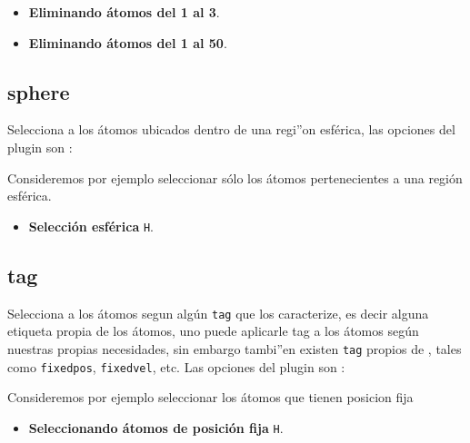 \begin{itemize}
 \item \textbf{Eliminando \'atomos del 1 al 3}.
 \item \textbf{Eliminando \'atomos del 1 al 50}.
\end{itemize}

\subsection{sphere}
Selecciona a los \'atomos ubicados dentro de una regi''on esf\'erica, las opciones del plugin son :


Consideremos por ejemplo seleccionar s\'olo los \'atomos pertenecientes a una regi\'on esf\'erica.

\begin{itemize}
 \item \textbf{Selecci\'on esf\'erica} \texttt{H}.
\end{itemize}

\subsection{tag}
Selecciona a los \'atomos segun alg\'un \verb|tag| que los caracterize, es decir alguna etiqueta propia de los \'atomos, uno puede aplicarle tag a los \'atomos seg\'un nuestras propias necesidades, sin embargo tambi''en existen \verb|tag| propios de {\lpmd}, tales como \verb|fixedpos|, \verb|fixedvel|, etc. Las opciones del plugin son :


Consideremos por ejemplo seleccionar los \'atomos que tienen posicion fija

\begin{itemize}
 \item \textbf{Seleccionando \'atomos de posici\'on fija} \texttt{H}.
\end{itemize}

